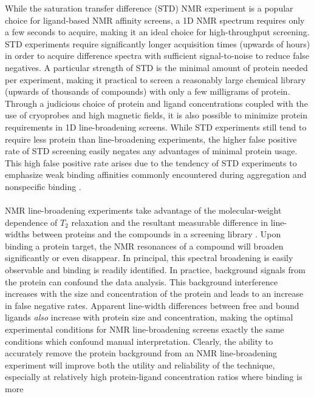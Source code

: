 \begin{doublespace}
While the saturation transfer difference (STD) NMR experiment
\cite{mayer:jacs2001} is a popular choice for ligand-based NMR affinity
screens, a 1D \hnmr{} NMR spectrum requires only a few seconds to acquire,
making it an ideal choice for high-throughput screening. STD experiments
require significantly longer acquisition times (upwards of hours) in order
to acquire difference spectra with sufficient signal-to-noise to reduce false
negatives. A particular strength of STD is the minimal amount of protein
needed per experiment, making it practical to screen a reasonably large
chemical library (upwards of thousands of compounds) with only a few
milligrams of protein. Through a judicious choice of protein and ligand
concentrations coupled with the use of cryoprobes and high magnetic fields,
it is also possible to minimize protein requirements in 1D \hnmr{}
line-broadening screens. While STD experiments still tend to require less
protein than line-broadening experiments, the higher false positive rate of
STD screening easily negates any advantages of minimal protein usage. This
high false positive rate arises due to the tendency of STD experiments to
emphasize weak binding affinities commonly encountered during aggregation
and nonspecific binding \cite{harner:jbnmr2013,lepre:menz2011}.
\\\\
NMR line-broadening experiments take advantage of the molecular-weight
dependence of $T_2$ relaxation and the resultant measurable difference in
line-widths between proteins and the compounds in a screening library
\cite{hajduk:jacs1997}. Upon binding a protein target, the \hnmr{} NMR
resonances of a compound will broaden significantly or even disappear.
In principal, this spectral broadening is easily observable and binding is
readily identified. In practice, background signals from the protein can
confound the data analysis. This background interference increases with the
size and concentration of the protein and leads to an increase in false
negative rates. Apparent line-width differences between free and bound
ligands \emph{also} increase with protein size and concentration, making the
optimal experimental conditions for NMR line-broadening screens exactly the
same conditions which confound manual interpretation. Clearly, the ability to
accurately remove the protein background from an NMR line-broadening experiment
will improve both the utility and reliability of the technique, especially at
relatively high protein-ligand concentration ratios where binding is more

\end{doublespace}
